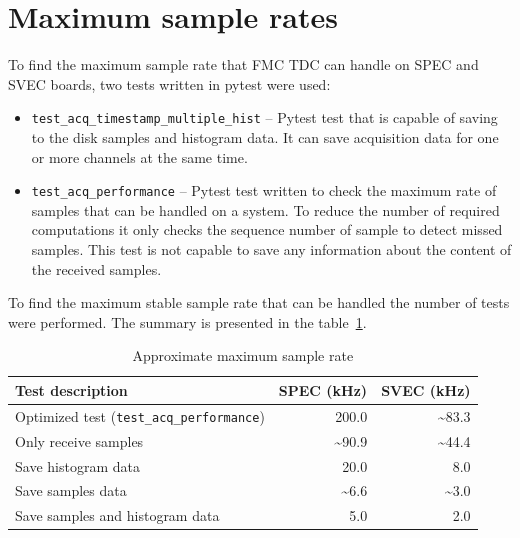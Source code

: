 \documentclass[a4paper, 12pt]{article}
\begin{document}
\FloatBarrier

\section{Maximum sample rates}
\label{performance}

To find the maximum sample rate that FMC TDC can handle on SPEC\cite{SPEC}
and SVEC\cite{SVEC} boards,
two tests written in pytest\cite{pytest} were used:
\begin{itemize}
  \item \texttt{test\_acq\_timestamp\_multiple\_hist} -- Pytest test that is
    capable of saving to the disk samples and histogram data.
    It can save acquisition data for one or more channels at the same time.
  \item \texttt{test\_acq\_performance} -- Pytest test written to check
    the maximum rate of samples that can be handled on a system.
    To reduce the number of required computations it only checks the sequence
    number of sample to detect missed samples. This test is not capable
    to save any information about the content of the received samples.
\end{itemize}

To find the maximum stable sample rate that can be handled the number of tests
were performed. The summary is presented in the table~\ref{max_sample_rate}.
\begin{table}[htbp]
\centering
\footnotesize
  \begin{tabular}{|l|r|r|}
    \hline {\bf Test description} & {\bf SPEC (kHz)} & {\bf SVEC (kHz)}  \\
    \hline
    Optimized test (\texttt{test\_acq\_performance}) &               200.0 & \textasciitilde83.3 \\
    Only receive samples                             & \textasciitilde90.9 & \textasciitilde44.4 \\
    Save histogram data                              &                20.0 &                 8.0 \\
    Save samples data                                &  \textasciitilde6.6 &  \textasciitilde3.0 \\
    Save samples and histogram data                  &                 5.0 &                 2.0 \\
    \hline
  \end{tabular}
  \caption{Approximate maximum sample rate}
  \label{max_sample_rate}
\end{table}
\end{document}
